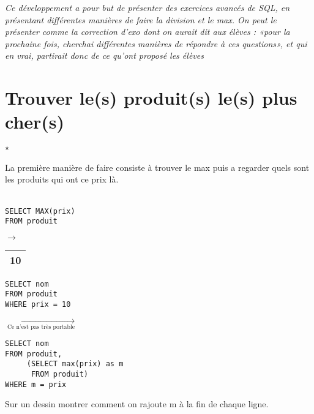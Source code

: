 
\textit{Ce développement a pour but de présenter des exercices avancés de SQL, en présentant différentes manières de faire la division et le max. On peut le présenter comme la correction d'exo dont on aurait dit aux élèves : «pour la prochaine fois, cherchai différentes manières de répondre à ces questions», et qui en vrai, partirait donc de ce qu'ont proposé les élèves}

\section*{Trouver le(s) produit(s) le(s) plus cher(s)}

\paragraph{$\star$}La première manière de faire consiste à trouver le max puis a regarder quels sont les produits qui ont ce prix là.
\\
\\
\begin{minipage}{0.4\linewidth}
	
\begin{lstlisting}
SELECT MAX(prix)
FROM produit	
\end{lstlisting}

$\to$ \begin{tabular}{|c|} \hline 10 \\ \hline \end{tabular}

\begin{lstlisting}
SELECT nom
FROM produit
WHERE prix = 10
\end{lstlisting}

\end{minipage} \enspace $\underset{\text{Ce n'est pas très portable}}\longrightarrow$ \enspace
\begin{minipage}{0.4\linewidth}
	
\begin{lstlisting}
SELECT nom
FROM produit,
     (SELECT max(prix) as m
      FROM produit)
WHERE m = prix
\end{lstlisting}

\end{minipage}


\begin{com}
	Sur un dessin montrer comment on rajoute m à la fin de chaque ligne.
\end{com}

